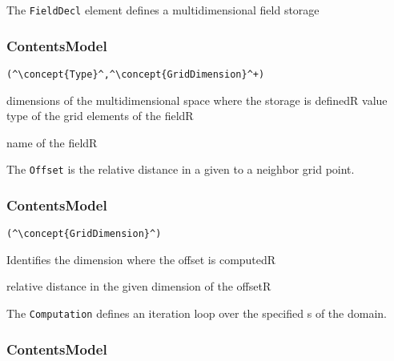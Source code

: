 The {\tt FieldDecl} element defines a multidimensional field storage
\subsubsection*{ContentsModel}{}

\begin{lstlisting}[style=default]
(^\concept{Type}^,^\concept{GridDimension}^+)
\end{lstlisting}

\begin{HIRChildElements}
	{dimensions of the multidimensional space where the storage is defined}{R}
	{value type of the grid elements of the field}{R}	
\end{HIRChildElements}

\begin{HIRAttributes}
	{name of the field}{R}
\end{HIRAttributes}


The {\tt Offset} is the relative distance in a given  to a neighbor grid point.

\subsubsection*{ContentsModel}{}

\begin{lstlisting}[style=default]
(^\concept{GridDimension}^)
\end{lstlisting}

\begin{HIRChildElements}
	{Identifies the dimension where the offset is computed}{R}
\end{HIRChildElements}

\begin{HIRAttributes}
	{relative distance in the given dimension of the offset}{R}
\end{HIRAttributes}

The {\tt Computation} defines an iteration loop over the specified s of the domain. 

\subsubsection*{ContentsModel}{}

